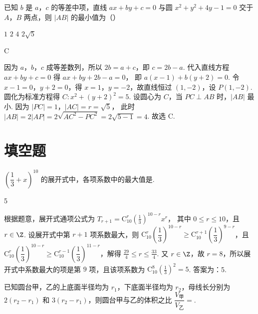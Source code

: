 \begin{problem}
已知 \( b \) 是 \(a\)，\(c\) 的等差中项，直线 \( ax+by+c=0 \) 与圆 \( x^2+y^2+4y-1=0 \) 交于 \(A\)，\(B\) 两点，则 \( \left| AB \right| \) 的最小值为（\quad）

\choices
    {\( 1 \)}
    {\( 2 \)}
    {\( 4 \)}
    {\( 2\sqrt{5} \)}
\end{problem}

\begin{answer}
C
\end{answer}

\begin{solution}
因为 \(a\)，\(b\)，\(c\) 成等差数列，所以 \( 2b=a+c \)，即 \( c=2b-a \).
代入直线方程 \( ax+by+c=0 \) 得
\(ax+by+2b-a=0\)，
即
\(a(x-1)+b(y+2)=0\).
令 \( x-1=0 \)，\( y+2=0 \)，得 \( x=1 \)，\( y=-2 \)，故直线恒过 \( (1,-2) \)，设 \( P(1,-2) \).
圆化为标准方程得
\(C:x^2+(y+2)^2=5\).
设圆心为 \(C\)，当 \( PC\perp AB \) 时，\( |AB| \) 最小.
因为
\(|PC|=1\)，\(|AC|=r=\sqrt{5}\)，
此时
\(|AB|=2|AP|=2\sqrt{AC^2-PC^2}=2\sqrt{5-1}=4\).
故选 C.
\end{solution}
\section{填空题}

\begin{problem}
\( \left( \dfrac{1}{3}+x \right)^{10} \) 的展开式中，各项系数中的最大值是\fillinblank{}.
\end{problem}

\begin{answer}
5
\end{answer}

\begin{solution}
根据题意，展开式通项公式为
\(T_{r+1}=\mathrm C_{10}^{r}\left( \frac{1}{3} \right)^{10-r}x^r\)，
其中 \( 0\le r\le 10 \)，且 \( r\in \Z \).
设展开式中第 \( r+1 \) 项系数最大，则 \( \mathrm C_{10}^{r}\left( \dfrac{1}{3} \right)^{10-r}\ge \mathrm C_{10}^{r+1}\left( \dfrac{1}{3} \right)^{9-r} \)，且 \( \mathrm C_{10}^{r}\left( \dfrac{1}{3} \right)^{10-r}\ge \mathrm C_{10}^{r-1}\left( \dfrac{1}{3} \right)^{11-r} \)，解得 \( \frac{29}{4}\le r\le \frac{33}{4} \).
又 \( r\in \Z \)，故 \( r=8 \)，所以展开式中系数最大的项是第 \( 9 \) 项，且该项系数为
\(\mathrm C_{10}^{8}\left( \frac{1}{3} \right)^2=5\).
答案为：5.
\end{solution}

\begin{problem}
已知圆台甲，乙的上底面半径均为 \( r_1 \)，下底面半径均为 \( r_2 \)，母线长分别为 \( 2\left( r_2-r_1 \right) \) 和 \( 3\left( r_2-r_1 \right) \)，则圆台甲与乙的体积之比 \( \dfrac{V_{\text{甲}}}{V_{\text{乙}}}= \)\fillinblank{}.
\end{problem}

